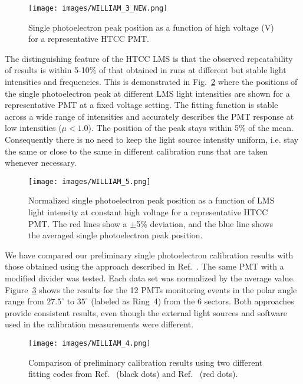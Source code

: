 \begin{figure}[ht]
\centering
\texttt{[image: images/WILLIAM\_3\_NEW.png]}
\caption{Single photoelectron peak position as a function of high voltage (V) for a representative HTCC PMT.}
\label{fig:WILLIAM_3_NEW}
\end{figure}

The distinguishing feature of the HTCC LMS is that the observed repeatability of results is within 5-10\% of that
obtained in runs at different but stable light intensities and frequencies. This is demonstrated in
Fig.~\ref{fig:WILLIAM_5} where the positions of the single photoelectron peak at different LMS light
intensities are shown for a representative PMT at a fixed voltage setting. The fitting function is stable across a
wide range of intensities and accurately describes the PMT response at low intensities ($\mu<1.0$). The position of
the peak stays within 5\% of the mean. Consequently there is no need to keep the light source intensity uniform, i.e.
stay the same or close to the same in different calibration runs that are taken whenever necessary.

\begin{figure}[ht]
\centering
\texttt{[image: images/WILLIAM\_5.png]}
\caption{Normalized single photoelectron peak position as a function of LMS light intensity at constant high voltage for a
  representative HTCC PMT. The red lines show a $\pm$5\% deviation, and the blue line shows the averaged
  single photoelectron peak position.}
\label{fig:WILLIAM_5}
\end{figure}

We have compared our preliminary single photoelectron calibration results with those obtained using the
approach described in Ref.~\cite{degtiarenko2017}. The same PMT with a modified divider was tested. Each data
set was normalized by the average value. Figure~\ref{fig:WILLIAM_4} shows the results for the 12 PMTs monitoring
events in the polar angle range from $27.5^\circ$ to $35^\circ$ (labeled as Ring~4) from the 6 sectors. Both approaches
provide consistent results, even though the external light sources and software used in the calibration measurements
were different.

\begin{figure}[ht]
\centering
\texttt{[image: images/WILLIAM\_4.png]}
\caption{Comparison of preliminary calibration results using two different fitting codes from
  Ref.~\cite{bellamy1996} (black dots) and Ref.~\cite{degtiarenko2017} (red dots).}
\label{fig:WILLIAM_4}
\end{figure}


